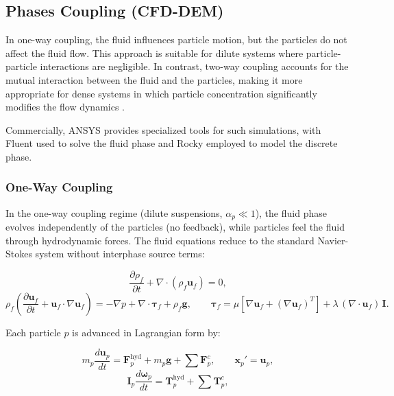\subsection{Phases Coupling (CFD-DEM)}

In one-way coupling, the fluid influences particle motion, but the particles do not affect the fluid flow. This approach is suitable for dilute systems where particle-particle interactions are negligible. In contrast, two-way coupling accounts for the mutual interaction between the fluid and the particles, making it more appropriate for dense systems in which particle concentration significantly modifies the flow dynamics  \cite{guzman2023coupled}.

Commercially, ANSYS provides specialized tools for such simulations, with Fluent used to solve the fluid phase and Rocky employed to model the discrete phase.

\subsubsection{One-Way Coupling}

In the one-way coupling regime (dilute suspensions, $\alpha_p \ll 1$), the fluid phase evolves independently of the particles (no feedback), while particles feel the fluid through hydrodynamic forces. The fluid equations reduce to the standard Navier-Stokes system without interphase source terms:

\begin{equation}
\frac{\partial \rho_f}{\partial t} + \nabla\cdot(\rho_f \mathbf{u}_f) = 0,
\end{equation}
\begin{equation}
\rho_f\left(\frac{\partial \mathbf{u}_f}{\partial t} + \mathbf{u}_f\cdot\nabla \mathbf{u}_f\right)
= -\nabla p + \nabla\cdot\boldsymbol{\tau}_f + \rho_f \mathbf{g},
\qquad
\boldsymbol{\tau}_f = \mu\left[\nabla \mathbf{u}_f + (\nabla \mathbf{u}_f)^{T}\right] + \lambda\,(\nabla\cdot \mathbf{u}_f)\,\mathbf{I}.
\end{equation}

Each particle $p$ is advanced in Lagrangian form by:

\begin{equation}
m_p \frac{d \mathbf{u}_p}{dt} = \mathbf{F}^{\text{hyd}}_p + m_p \mathbf{g} + \sum \mathbf{F}^{c}_p,
\qquad
\mathbf{x}_p' = \mathbf{u}_p,
\end{equation}
\begin{equation}
\mathbf{I}_p \frac{d \boldsymbol{\omega}_p}{dt} = \mathbf{T}^{\text{hyd}}_p + \sum \mathbf{T}^{c}_p,
\end{equation}

